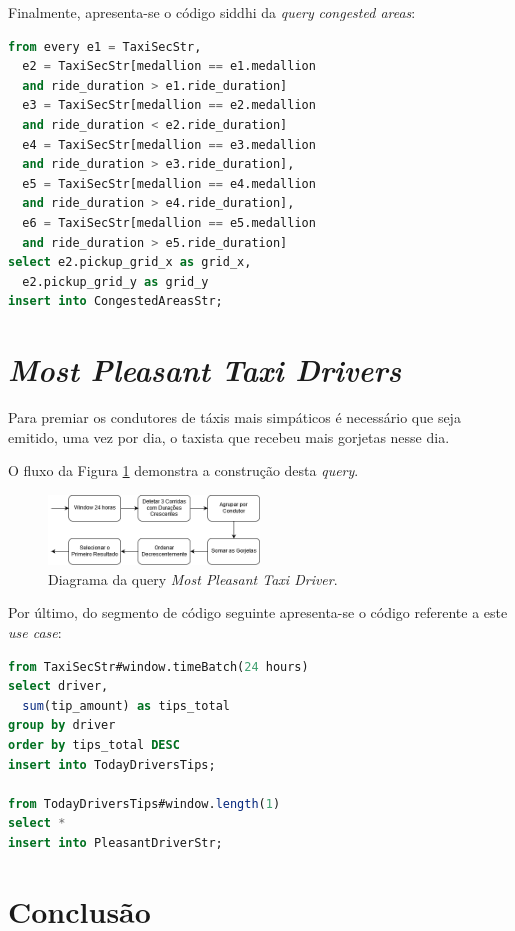 \documentclass[article]{IEEEtran}
\begin{document}
Finalmente, apresenta-se o código siddhi da \textit{query} \textit{congested areas}:

\begin{lstlisting}[language=SQL]
from every e1 = TaxiSecStr,
  e2 = TaxiSecStr[medallion == e1.medallion
  and ride_duration > e1.ride_duration]
  e3 = TaxiSecStr[medallion == e2.medallion
  and ride_duration < e2.ride_duration]
  e4 = TaxiSecStr[medallion == e3.medallion
  and ride_duration > e3.ride_duration],
  e5 = TaxiSecStr[medallion == e4.medallion
  and ride_duration > e4.ride_duration],
  e6 = TaxiSecStr[medallion == e5.medallion
  and ride_duration > e5.ride_duration]
select e2.pickup_grid_x as grid_x,
  e2.pickup_grid_y as grid_y
insert into CongestedAreasStr;
\end{lstlisting}



\section{\textit{Most Pleasant Taxi Drivers}}

Para premiar os condutores de táxis mais simpáticos é necessário que seja emitido, uma vez por dia, o taxista que recebeu mais gorjetas nesse dia.

O fluxo da Figura \ref{fig:pleasantDriverDiagram} demonstra a construção desta \textit{query}.

\begin{figure}[hbtp]
    \centering
        \includegraphics[width=0.5\textwidth]{images/pleasantDriver}
    \caption{Diagrama da query \textit{Most Pleasant Taxi Driver}.}
    \label{fig:pleasantDriverDiagram}
\end{figure}

Por último, do segmento de código seguinte apresenta-se o código referente a este \textit{use case}:

\begin{lstlisting}[language=SQL]
from TaxiSecStr#window.timeBatch(24 hours)
select driver, 
  sum(tip_amount) as tips_total
group by driver
order by tips_total DESC
insert into TodayDriversTips;

from TodayDriversTips#window.length(1)
select *
insert into PleasantDriverStr;
\end{lstlisting}

\section{Conclusão} 





\end{document}

